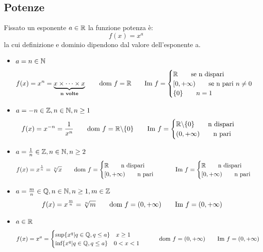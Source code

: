\subsection{Potenze}
Fissato un esponente $a \in \mathbb{R}$ la funzione potenza è:
\[f(x)=x^a\]
la cui definizione e dominio dipendono dal valore dell’esponente a.
\begin{itemize}
\item $a=n \in \mathbb{N}$
\[f(x)=x^n= \underbrace{x \times \dots \times x}_{\textbf{n volte}} \qquad \text{dom } f=\mathbb{R} \qquad \text{Im } f= 
\begin{cases}
		\mathbb{R} \qquad \text{se n dispari} \\
		[0,+\infty )  \qquad \text{se n pari } n \neq 0 \\
		\{0\}  \qquad n = 1
\end{cases}\]

\item $a=-n\in \mathbb{Z} , n\in \mathbb{N} ,n \geq 1$
\[f(x)=x^{-n}=\frac{1}{x^n} \qquad \text{dom } f = \mathbb{R} \backslash \{0\} \qquad \text{Im } f=
\begin{cases}
		\mathbb{R} \backslash \{0\} \qquad \text{n dispari} \\
		(0,+\infty )  \qquad \text{n pari }
\end{cases}
\]
\item $a=\frac{1}{n} \in \mathbb{Z} , n\in \mathbb{N} ,n \geq 2$
\[f(x)=x^{\frac{1}{n}}=\sqrt[n]{x} \qquad 
\dom f = 
\begin{cases}
		\R \qquad \text{n dispari} \\
		[0,+\infty )  \qquad \text{n pari }
\end{cases}
\qquad \im f=
\begin{cases}
		\R \qquad \text{n dispari} \\
		[0,+\infty) \qquad \text{n pari }
\end{cases}
\]

\item $a=\frac{m}{n} \in \mathbb{Q} , n\in \mathbb{N} ,n \geq 1 , m \in \mathbb{Z}$
\[f(x)=x^{\frac{m}{n}}=\sqrt[n]{m} \qquad 
\text{dom } f = (0,+\infty)
\qquad \text{Im } f=(0,+\infty)\]

\item $a \in \mathbb{R}$
\[f(x)=x^a=
\begin{cases}
	\text{sup}\{x^q | q \in \mathbb{Q} , q \leq a\} \quad x \geq 1 \\
	\text{inf} \{x^q | q\in \mathbb{Q} , q \leq a\} \quad 0 < x < 1
\end{cases}
\qquad
\text{dom } f = (0, + \infty)
\qquad
\text{Im } f = (0, + \infty)
\]


\end{itemize}


